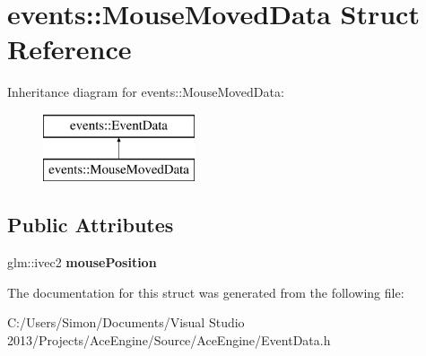 \hypertarget{structevents_1_1_mouse_moved_data}{}\section{events\+:\+:Mouse\+Moved\+Data Struct Reference}
\label{structevents_1_1_mouse_moved_data}
Inheritance diagram for events\+:\+:Mouse\+Moved\+Data\+:\begin{figure}[H]
\begin{center}
\leavevmode
\includegraphics[height=2.000000cm]{structevents_1_1_mouse_moved_data}
\end{center}
\end{figure}
\subsection*{Public Attributes}
\begin{DoxyCompactItemize}
\item 
\hypertarget{structevents_1_1_mouse_moved_data_ad94258e6205be851ad91d5722a63f4c7}{}glm\+::ivec2 {\bfseries mouse\+Position}\label{structevents_1_1_mouse_moved_data_ad94258e6205be851ad91d5722a63f4c7}

\end{DoxyCompactItemize}


The documentation for this struct was generated from the following file\+:\begin{DoxyCompactItemize}
\item 
C\+:/\+Users/\+Simon/\+Documents/\+Visual Studio 2013/\+Projects/\+Ace\+Engine/\+Source/\+Ace\+Engine/Event\+Data.\+h\end{DoxyCompactItemize}
